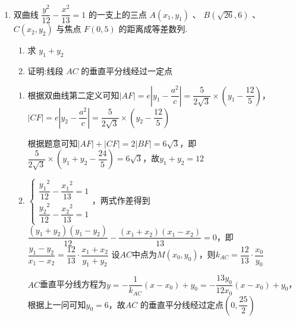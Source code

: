 \begin{enumerate}
\begin{jieda}
\begin{enumerate}
            综上，$k \in \left( {2,2\sqrt{2}}\right)$时满足要求.
        \end{enumerate}
    \end{jieda}
    \item 双曲线 $\dfrac{{y}^{2}}{12} - \dfrac{{x}^{2}}{13} = 1$ 的一支上的三点 $A\left( {{x}_{1},{y}_{1}}\right)$ 、 ${B}\left( {\sqrt{26},6}\right)$ 、 ${C}\left( {{x}_{2},{y}_{2}}\right)$ 与焦点 $F\left( {0,5}\right)$ 的距离成等差数列. 
    \begin{enumerate}
        \item 求 ${y}_{1} + {y}_{2}$
        \item 证明:线段 ${AC}$ 的垂直平分线经过一定点
    \end{enumerate}
    \begin{jieda}
        \begin{enumerate}
            \item 根据双曲线第二定义可知$|AF| = e\left|y_1-\dfrac{a^2}{c}\right| = \dfrac{5}{2\sqrt{3}} \times \left(y_1-\dfrac{12}{5}\right)$，$|CF| = e\left|y_2-\dfrac{a^2}{c}\right| = \dfrac{5}{2\sqrt{3}} \times \left(y_2-\dfrac{12}{5}\right)$

            根据题意可知$|AF|+|CF| = 2|BF| = 6\sqrt{3}$，即$\dfrac{5}{2\sqrt{3}} \times \left(y_1+y_2-\dfrac{24}{5}\right) = 6\sqrt{3}$，故$y_1+y_2 = 12$
            
            \item $\left\{\begin{array}{l}
                 \dfrac{{y_1}^{2}}{12} - \dfrac{{x_1}^{2}}{13} = 1  \\
                 \dfrac{{y_2}^{2}}{12} - \dfrac{{x_2}^{2}}{13} = 1
            \end{array}\right.$，两式作差得到$\dfrac{(y_1+y_2)(y_1-y_2)}{12} - \dfrac{(x_1+x_2)(x_1-x_2)}{13} = 0$，即$\dfrac{y_1-y_2}{x_1-x_2} = \dfrac{12}{13} \cdot \dfrac{x_1+x_2}{y_1+y_2}$
            设$AC$中点为$M(x_0, y_0)$，则$k_{AC} = \dfrac{12}{13} \cdot \dfrac{x_0}{y_0}$

            $AC$垂直平分线方程为$y = -\dfrac{1}{k_{AC}} (x - x_0) + y_0 = -\dfrac{13y_0}{12x_0}(x-x_0)+y_0$，根据上一问可知$y_0 = 6$，故${AC}$ 的垂直平分线经过定点$\left( {0,\dfrac{25}{2}}\right)$
        \end{enumerate}
    \end{jieda}
\end{enumerate}